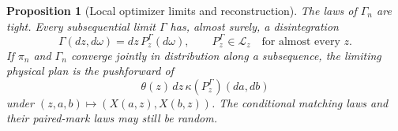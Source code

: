 \documentclass[11pt,reqno]{amsart}
\newtheorem{proposition}[theorem]{Proposition}
\theoremstyle{definition}
\theoremstyle{remark}
\numberwithin{equation}{section}
\begin{document}
\begin{proposition}[Local optimizer limits and reconstruction]
\label{prop:highd-local-limit}
The laws of \(\Gamma_n\) are tight. Every subsequential limit
\(\Gamma\) has, almost surely, a disintegration
\[
\Gamma(dz,d\omega)=dz\,P_z^\Gamma(d\omega),
\qquad P_z^\Gamma\in\mathcal L_z
\quad\text{for almost every }z.
\]
If \(\pi_n\) and \(\Gamma_n\) converge jointly in distribution
along a subsequence, the limiting physical plan is the pushforward of
\begin{equation}
\theta(z)\,dz\,\kappa(P_z^\Gamma)(da,db)
\label{eq:highd-reconstruction}
\end{equation}
under \((z,a,b)\mapsto(X(a,z),X(b,z))\).
The conditional matching laws and their paired-mark laws may still
be random.
\end{proposition}
\end{document}

